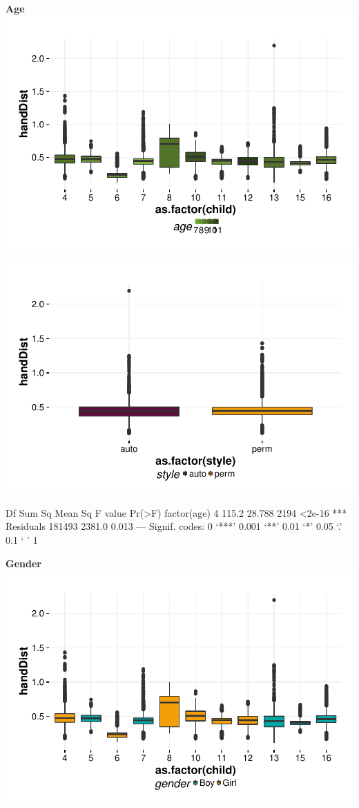 \documentclass{article}
\begin{document}
\textbf{Age}
\includegraphics{features-plot_handdistance_child_age_quiz}

\includegraphics{features-plot_handdistance_style_quiz}

\begin{Schunk}
\begin{Soutput}
                Df Sum Sq Mean Sq F value Pr(>F)    
factor(age)      4  115.2  28.788    2194 <2e-16 ***
Residuals   181493 2381.0   0.013                   
---
Signif. codes:  0 ‘***’ 0.001 ‘**’ 0.01 ‘*’ 0.05 ‘.’ 0.1 ‘ ’ 1
\end{Soutput}
\end{Schunk}

\textbf{Gender}
\includegraphics{features-plot_handdistance_child_gender_quiz}
\end{document}
